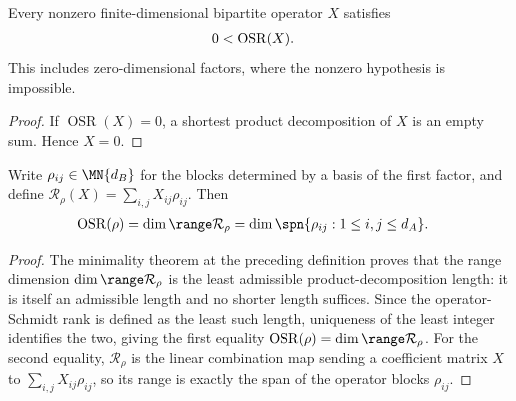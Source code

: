 \begin{theorem}
    \label{thm:operator_schmidt_rank_pos}
    \leanok

    Every nonzero finite-dimensional bipartite operator $X$ satisfies
    \begin{align}
        0 & <\operatorname{OSR}(X).
        \notag
    \end{align}
    This includes zero-dimensional factors, where the nonzero hypothesis is
    impossible.
\end{theorem}

\begin{proof}\leanok

    If $\operatorname{OSR}(X)=0$, a shortest product decomposition of $X$ is
    an empty sum. Hence $X=0$.
\end{proof}
\begin{theorem}
    \label{thm:operator_schmidt_coefficient_space}
    \leanok

    Write $\rho_{ij}\in\MN{d_B}$ for the blocks determined by a basis
    of the first factor, and define
    $\mathcal R_\rho(X)=\sum_{i,j}X_{ij}\rho_{ij}$. Then
    \begin{align}
        \operatorname{OSR}(\rho)
         & =\dim\range\mathcal R_\rho
        =\dim\spn\{\rho_{ij}:1\leq i,j\leq d_A\}.
        \notag
    \end{align}
\end{theorem}
\begin{proof}\leanok

    The minimality theorem at the preceding definition proves that the range
    dimension $\dim\range\mathcal R_\rho$ is the least admissible
    product-decomposition length: it is itself an admissible length and no
    shorter length suffices. Since the operator-Schmidt rank is defined as the
    least such length, uniqueness of the least integer identifies the two, giving
    the first equality $\operatorname{OSR}(\rho)=\dim\range\mathcal R_\rho$. For
    the second equality, $\mathcal R_\rho$ is the linear combination map sending
    a coefficient matrix $X$ to $\sum_{i,j}X_{ij}\rho_{ij}$, so its range is
    exactly the span of the operator blocks $\rho_{ij}$.
\end{proof}

